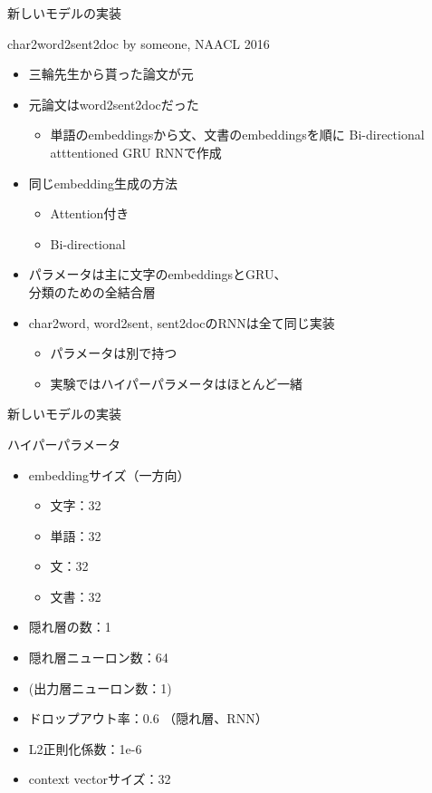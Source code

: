 \documentclass[aspectratio=43,unicode,10pt]{beamer}
\begin{document}
\begin{frame}{新しいモデルの実装}
  \begin{block}{char2word2sent2doc by someone, NAACL 2016}
    \begin{itemize}
      \item 三輪先生から貰った論文が元
      \item 元論文はword2sent2docだった
        \begin{itemize}
          \item 単語のembeddingsから文、文書のembeddingsを順に
                Bi-directional atttentioned GRU RNNで作成
        \end{itemize}
      \item 同じembedding生成の方法
        \begin{itemize}
          \item Attention付き
          \item Bi-directional
        \end{itemize}
      \item パラメータは主に文字のembeddingsとGRU、\\分類のための全結合層
      \item char2word, word2sent, sent2docのRNNは全て同じ実装
        \begin{itemize}
          \item パラメータは別で持つ
          \item 実験ではハイパーパラメータはほとんど一緒
        \end{itemize}
    \end{itemize}
  \end{block}
\end{frame}

\begin{frame}{新しいモデルの実装}
  \begin{block}{ハイパーパラメータ}
    \begin{itemize}
      \item embeddingサイズ（一方向）
        \begin{itemize}
          \item 文字：32
          \item 単語：32
          \item 文：32
          \item 文書：32
        \end{itemize}
      \item 隠れ層の数：1
      \item 隠れ層ニューロン数：64
      \item (出力層ニューロン数：1)
      \item ドロップアウト率：0.6 （隠れ層、RNN）
      \item L2正則化係数：1e-6
      \item context vectorサイズ：32
    \end{itemize}
  \end{block}
\end{frame}
\end{document}
